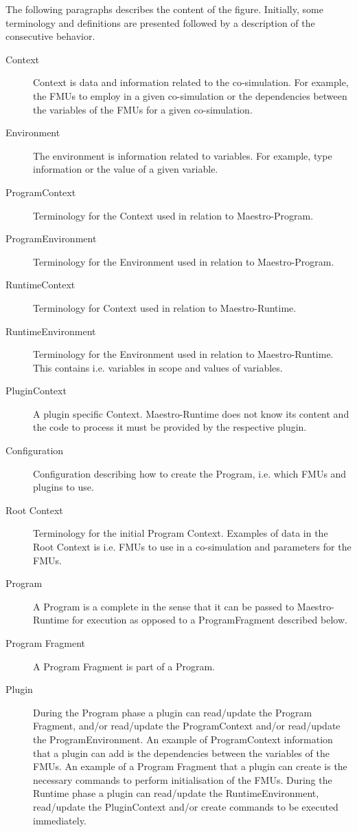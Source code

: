The following paragraphs describes the content of the figure. Initially, some
terminology and definitions are presented followed by a description of the
consecutive behavior.
\begin{description}
  \item[Context] Context is data and information related to the co-simulation.
    For example, the FMUs to employ in a given co-simulation or the dependencies
    between the variables of the FMUs for a given co-simulation.
  \item[Environment] The environment is information related to variables. For
    example, type information or the value of a given variable.
  \item[ProgramContext] Terminology for the Context used in relation to
    Maestro-Program.
  \item[ProgramEnvironment] Terminology for the Environment used in relation to
    Maestro-Program.
  \item[RuntimeContext] Terminology for Context used in relation to
    Maestro-Runtime.
  \item[RuntimeEnvironment] Terminology for the Environment used in relation to
    Maestro-Runtime. This contains i.e. variables in scope and values of variables.
  \item[PluginContext] A plugin specific Context. Maestro-Runtime does not know
    its content and the code to process it must be provided by the respective
    plugin.
    \item[Configuration] Configuration describing how to create the Program,
    i.e. which FMUs and plugins to use.
  \item[Root Context] Terminology for the initial Program Context. Examples of
    data in the Root Context is i.e. FMUs to use in a
    co-simulation and parameters for the FMUs.
  \item[Program] A Program is a complete in the sense that it can be passed to
    Maestro-Runtime for execution as opposed to a ProgramFragment described below.
  \item[Program Fragment] A Program Fragment is part of a Program.
  \item[Plugin] During the Program phase a plugin can read/update the Program
    Fragment, and/or read/update the ProgramContext and/or read/update the
    ProgramEnvironment. An example of ProgramContext information that a plugin can
    add is the dependencies between the variables of the FMUs. An example of a
    Program Fragment that a plugin can create is the necessary commands to perform
    initialisation of the FMUs. During the Runtime phase a plugin can read/update
    the RuntimeEnvironment, read/update the PluginContext and/or create commands to
    be executed immediately.
\end{description}

